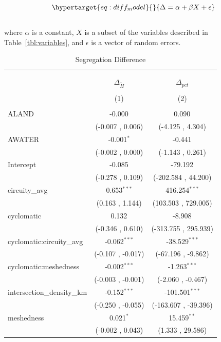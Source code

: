 \documentclass[
  10pt,
]{article}
\begin{document}
\begin{equation}\protect\hypertarget{eq:diff_model}{}{
\Delta = \alpha + \beta X + \epsilon
}\label{eq:diff_model}\end{equation}\\
where \(\alpha\) is a constant, \(X\) is a subset of the variables
described in Table~\ref{tbl:variables}, and \(\epsilon\) is a vector of
random errors.

\begin{table}[!htbp] \centering
  \caption{Segregation Difference}
\begin{tabular}{@{\extracolsep{5pt}}lcc}
\\[-1.8ex]\hline
\hline \\[-1.8ex]
\\[-1.8ex] & \multicolumn{1}{c}{$\Delta_{\tilde{H}}$} & \multicolumn{1}{c}{$\Delta_{pct}$}  \\
\\[-1.8ex] & (1) & (2) \\
\hline \\[-1.8ex]
 ALAND & -0.000$^{}$ & 0.090$^{}$ \\
  & (-0.007 , 0.006) & (-4.125 , 4.304) \\
 AWATER & -0.001$^{*}$ & -0.441$^{}$ \\
  & (-0.002 , 0.000) & (-1.143 , 0.261) \\
 Intercept & -0.085$^{}$ & -79.192$^{}$ \\
  & (-0.278 , 0.109) & (-202.584 , 44.200) \\
 circuity\_avg & 0.653$^{***}$ & 416.254$^{***}$ \\
  & (0.163 , 1.144) & (103.503 , 729.005) \\
 cyclomatic & 0.132$^{}$ & -8.908$^{}$ \\
  & (-0.346 , 0.610) & (-313.755 , 295.939) \\
 cyclomatic:circuity\_avg & -0.062$^{***}$ & -38.529$^{***}$ \\
  & (-0.107 , -0.017) & (-67.196 , -9.862) \\
 cyclomatic:meshedness & -0.002$^{***}$ & -1.263$^{***}$ \\
  & (-0.003 , -0.001) & (-2.060 , -0.467) \\
 intersection\_density\_km & -0.152$^{***}$ & -101.501$^{***}$ \\
  & (-0.250 , -0.055) & (-163.607 , -39.396) \\
 meshedness & 0.021$^{*}$ & 15.459$^{**}$ \\
  & (-0.002 , 0.043) & (1.333 , 29.586) \\

\end{tabular}
\end{table}
\end{document}
